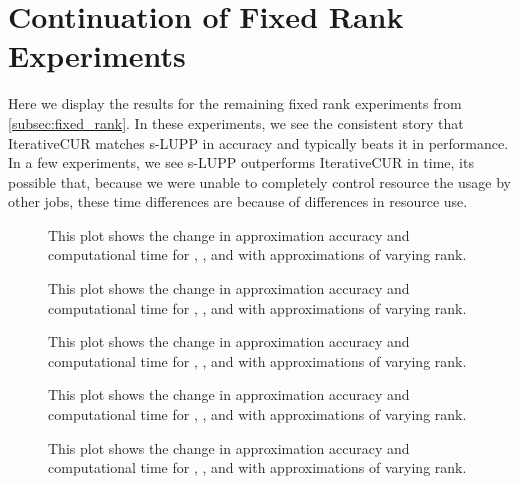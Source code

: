 \section{Continuation of Fixed Rank Experiments}
Here we display the results for the remaining fixed rank experiments from \cref{subsec:fixed_rank}. In these experiments, we see the consistent story that IterativeCUR matches s-LUPP in accuracy and typically beats it in performance. In a few experiments, we see s-LUPP outperforms IterativeCUR in time, its possible that, because we were unable to completely control resource the usage by other jobs, these time differences are because of differences in resource use. 

\begin{figure}[H]
     \centering
     
     \caption{This plot shows the change in approximation accuracy and computational time for \svds, \icurl, and \curs with approximations of varying rank.}
     \label{fig:fixed_rank_c-67}
 \end{figure}
\begin{figure}[H]
    \centering
    
    \caption{This plot shows the change in approximation accuracy and computational time for \svds, \icurl, and \curs with approximations of varying rank.}
    \label{fig:fixed_rank_c-69}
\end{figure}
\begin{figure}[H]
    \centering
    
    \caption{This plot shows the change in approximation accuracy and computational time for \svds, \icurl, and \curs with approximations of varying rank.}
    \label{fig:fixed_rank_ct20stif}
\end{figure}

\begin{figure}[H]
    \centering
    
    \caption{This plot shows the change in approximation accuracy and computational time for \svds, \icurl, and \curs with approximations of varying rank.}
    \label{fig:fixed_rank_mark3}
\end{figure}
\begin{figure}[H]
    \centering
    
    \caption{This plot shows the change in approximation accuracy and computational time for \svds, \icurl, and \curs with approximations of varying rank.}
    \label{fig:fixed_rank_tsopf}
\end{figure}

